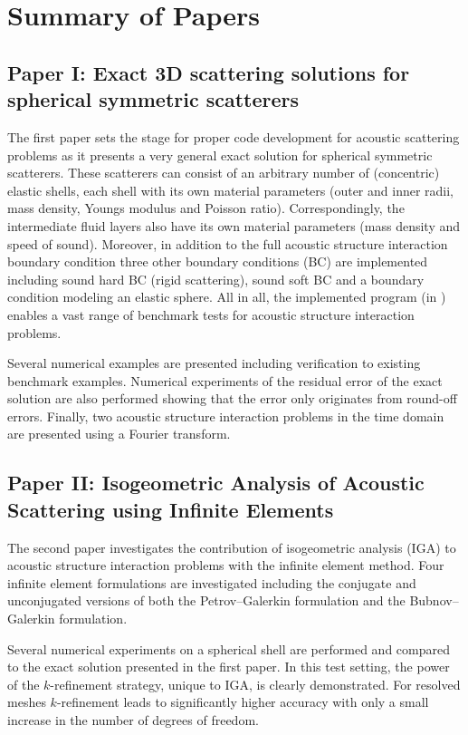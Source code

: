 \section{Summary of Papers}

\subsection{Paper I: Exact 3D scattering solutions for spherical symmetric scatterers}
The first paper sets the stage for proper code development for acoustic scattering problems as it presents a very general exact solution for spherical symmetric scatterers. These scatterers can consist of an arbitrary number of (concentric) elastic shells, each shell with its own material parameters (outer and inner radii, mass density, Youngs modulus and Poisson ratio). Correspondingly, the intermediate fluid layers also have its own material parameters (mass density and speed of sound). Moreover, in addition to the full acoustic structure interaction boundary condition three other boundary conditions (BC) are implemented including sound hard BC (rigid scattering), sound soft BC and a boundary condition modeling an elastic sphere. All in all, the implemented program (in \MATLAB) enables a vast range of benchmark tests for acoustic structure interaction problems. 

Several numerical examples are presented including verification to existing benchmark examples. Numerical experiments of the residual error of the exact solution are also performed showing that the error only originates from round-off errors. Finally, two acoustic structure interaction problems in the time domain are presented using a Fourier transform.

\subsection{Paper II: Isogeometric Analysis of Acoustic Scattering using Infinite Elements}
The second paper investigates the contribution of isogeometric analysis (IGA) to acoustic structure interaction problems with the infinite element method. Four infinite element formulations are investigated including the conjugate and unconjugated versions of both the Petrov--Galerkin formulation and the Bubnov--Galerkin formulation. 

Several numerical experiments on a spherical shell are performed and compared to the exact solution presented in the first paper. In this test setting, the power of the $k$-refinement strategy, unique to IGA, is clearly demonstrated. For resolved meshes $k$-refinement leads to significantly higher accuracy with only a small increase in the number of degrees of freedom. 

